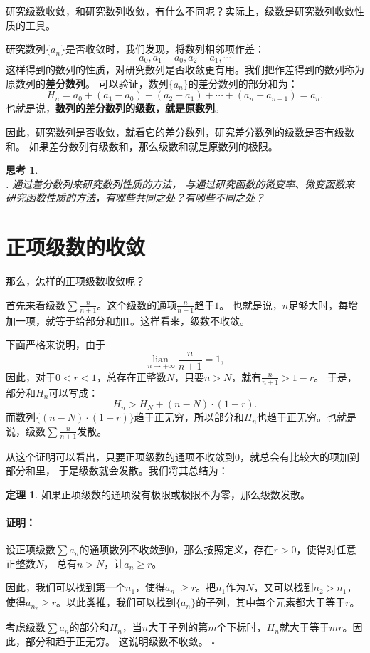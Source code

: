 \documentclass[12pt,UTF8]{ctexbook}
\newcommand{\lian}[1]{
    \underset{#1}{\operatorname{lian}\,}
}
\theoremstyle{definition}
\newtheorem{tm}{定理}[section]
\theoremstyle{plain}
\newtheorem{sk}{思考}[section]
\renewenvironment{proof}{\paragraph{\textbf{证明：}}}{\hfill$\square$}
\begin{document}
研究级数收敛，和研究数列收敛，有什么不同呢？实际上，级数是研究数列收敛性质的工具。

研究数列$\{a_n\}$是否收敛时，我们发现，将数列相邻项作差：
$$ a_0, a_1 - a_0, a_2 - a_1, \cdots $$
这样得到的数列的性质，对研究数列是否收敛更有用。我们把作差得到的数列称为原数列的\textbf{差分数列}。
可以验证，数列$\{a_n\}$的差分数列的部分和为：
$$ H_n = a_0 + (a_1 - a_0) + (a_2 - a_1) + \cdots + (a_n - a_{n-1}) = a_n. $$
也就是说，\textbf{数列的差分数列的级数，就是原数列}。

因此，研究数列是否收敛，就看它的差分数列，研究差分数列的级数是否有级数和。
如果差分数列有级数和，那么级数和就是原数列的极限。

\begin{sk}
    \mbox{} \\
    . 通过差分数列来研究数列性质的方法，
    与通过研究函数的微变率、微变函数来研究函数性质的方法，有哪些共同之处？有哪些不同之处？
\end{sk}

\section{正项级数的收敛}
那么，怎样的正项级数收敛呢？

首先来看级数$\sum \frac{n}{n+1}$。这个级数的通项$\frac{n}{n+1}$趋于$1$。
也就是说，$n$足够大时，每增加一项，就等于给部分和加$1$。这样看来，级数不收敛。

下面严格来说明，由于
$$\lian{n\to +\infty }\frac{n}{n+1} = 1,$$
因此，对于$0<r<1$，总存在正整数$N$，只要$n>N$，就有$\frac{n}{n+1} > 1 - r$。
于是，部分和$H_n$可以写成：
$$ H_n > H_N + (n - N) \cdot (1 - r).$$
而数列$\{(n - N) \cdot (1 - r)\}$趋于正无穷，所以部分和$H_n$也趋于正无穷。也就是说，级数$\sum \frac{n}{n+1}$发散。

从这个证明可以看出，只要正项级数的通项不收敛到$0$，就总会有比较大的项加到部分和里，
于是级数就会发散。我们将其总结为：
\begin{tm}
    如果正项级数的通项没有极限或极限不为零，那么级数发散。
\end{tm}
\begin{proof}
    设正项级数$\sum a_n$的通项数列不收敛到$0$，那么按照定义，存在$r>0$，使得对任意正整数$N$，
    总有$n > N$，让$a_n \geqslant r$。

    因此，我们可以找到第一个$n_1$，使得$a_{n_1} \geqslant r$。把$n_1$作为$N$，又可以找到$n_2 > n_1$，
    使得$a_{n_2} \geqslant r$。以此类推，我们可以找到$\{a_n\}$的子列，其中每个元素都大于等于$r$。

    考虑级数$\sum a_n$的部分和$H_n$，当$n$大于子列的第$m$个下标时，$H_n$就大于等于$mr$。因此，部分和趋于正无穷。
    这说明级数不收敛。
\end{proof}
\end{document}
